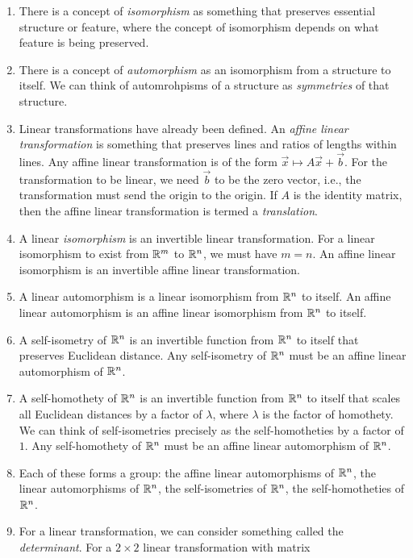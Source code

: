 \documentclass[10pt]{amsart}
\begin{document}
\begin{enumerate}
\item There is a concept of {\em isomorphism} as something that
  preserves essential structure or feature, where the concept of
  isomorphism depends on what feature is being preserved.
\item There is a concept of {\em automorphism} as an isomorphism from
  a structure to itself. We can think of automrohpisms of a structure
  as {\em symmetries} of that structure.
\item Linear transformations have already been defined. An {\em affine
  linear transformation} is something that preserves lines and ratios
  of lengths within lines. Any affine linear transformation is of the
  form $\vec{x} \mapsto A\vec{x} + \vec{b}$. For the transformation to
  be linear, we need $\vec{b}$ to be the zero vector, i.e., the
  transformation must send the origin to the origin. If $A$ is the
  identity matrix, then the affine linear transformation is termed a
  {\em translation}.
\item A linear {\em isomorphism} is an invertible linear
  transformation. For a linear isomorphism to exist from $\mathbb{R}^m$ to
  $\mathbb{R}^n$, we must have $m = n$. An affine linear isomorphism is an
  invertible affine linear transformation.
\item A linear automorphism is a linear isomorphism from $\mathbb{R}^n$ to
  itself. An affine linear automorphism is an affine linear
  isomorphism from $\mathbb{R}^n$ to itself.
\item A self-isometry of $\mathbb{R}^n$ is an invertible function from $\mathbb{R}^n$
  to itself that preserves Euclidean distance. Any self-isometry of
  $\mathbb{R}^n$ must be an affine linear automorphism of $\mathbb{R}^n$.
\item A self-homothety of $\mathbb{R}^n$ is an invertible function from $\mathbb{R}^n$
  to itself that scales all Euclidean distances by a factor of
  $\lambda$, where $\lambda$ is the factor of homothety. We can think
  of self-isometries precisely as the self-homotheties by a factor of
  $1$. Any self-homothety of $\mathbb{R}^n$ must be an affine linear
  automorphism of $\mathbb{R}^n$.
\item Each of these forms a group: the affine linear automorphisms of
  $\mathbb{R}^n$, the linear automorphisms of $\mathbb{R}^n$, the self-isometries of
  $\mathbb{R}^n$, the self-homotheties of $\mathbb{R}^n$.
\item For a linear transformation, we can consider something called
  the {\em determinant}. For a $2 \times 2$ linear transformation with
  matrix


\end{enumerate}
\end{document}
